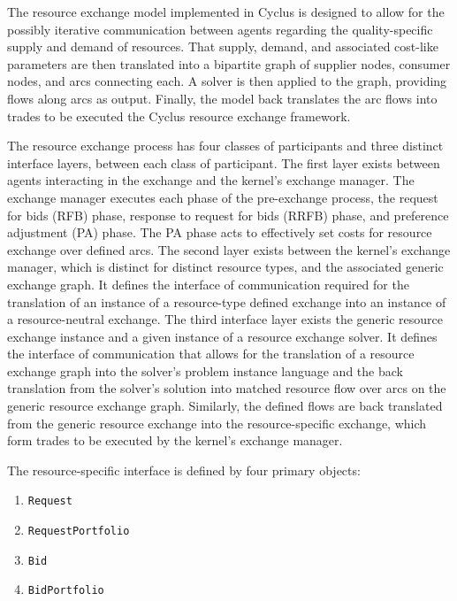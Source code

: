The resource exchange model implemented in Cyclus is designed to allow for the
possibly iterative communication between agents regarding the quality-specific
supply and demand of resources. That supply, demand, and associated cost-like
parameters are then translated into a bipartite graph of supplier nodes,
consumer nodes, and arcs connecting each. A solver is then applied to the graph,
providing flows along arcs as output. Finally, the model back translates the arc
flows into trades to be executed the Cyclus resource exchange framework.

The resource exchange process has four classes of participants and three
distinct interface layers, between each class of participant. The first layer
exists between agents interacting in the exchange and the kernel's exchange
manager. The exchange manager executes each phase of the pre-exchange process,
the request for bids (RFB) phase, response to request for bids (RRFB) phase, and
preference adjustment (PA) phase. The PA phase acts to effectively set costs for
resource exchange over defined arcs. The second layer exists between the
kernel's exchange manager, which is distinct for distinct resource types, and
the associated generic exchange graph. It defines the interface of communication
required for the translation of an instance of a resource-type defined exchange
into an instance of a resource-neutral exchange. The third interface layer
exists the generic resource exchange instance and a given instance of a resource
exchange solver. It defines the interface of communication that allows for the
translation of a resource exchange graph into the solver's problem instance
language and the back translation from the solver's solution into matched
resource flow over arcs on the generic resource exchange graph. Similarly, the
defined flows are back translated from the generic resource exchange into the
resource-specific exchange, which form trades to be executed by the kernel's
exchange manager.


The resource-specific interface is defined by four primary objects:
\begin{enumerate}
  \item \texttt{Request}
  \item \texttt{RequestPortfolio}
  \item \texttt{Bid}
  \item \texttt{BidPortfolio}
\end{enumerate}
